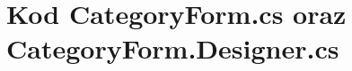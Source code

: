 \documentclass[a4paper, 11pt]{article}
\begin{document}
    \newpage
    
    
    
    \newpage
    
    
    
    \newpage
    
    
    
    \newpage

    \section{Kod CategoryForm.cs oraz CategoryForm.Designer.cs}
    
    
    
    \newpage
    
    


    
    
\end{document}
